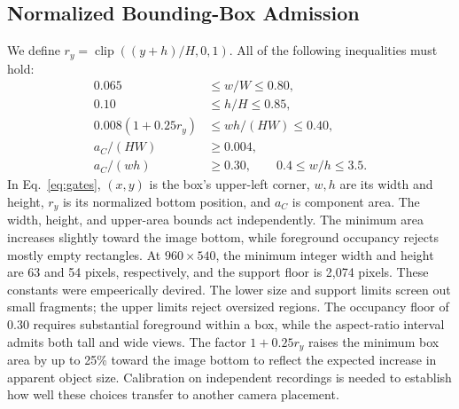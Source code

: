 \documentclass[conference]{IEEEtran}
\begin{document}
\subsection{Normalized Bounding-Box Admission}
We define $r_y=\operatorname{clip}((y+h)/H,0,1)$. All of the following inequalities must hold:
\begin{equation}
\begin{aligned}
0.065&\le w/W\le0.80,\\
0.10&\le h/H\le0.85,\\
0.008(1+0.25r_y)&\le wh/(HW)\le0.40,\\
a_C/(HW)&\ge0.004,\\
a_C/(wh)&\ge0.30,\qquad 0.4\le w/h\le3.5.
\end{aligned}
\label{eq:gates}
\end{equation}
In Eq.~\eqref{eq:gates}, $(x,y)$ is the box's upper-left corner, $w,h$ are its width and height, $r_y$ is its normalized bottom position, and $a_C$ is component area. The width, height, and upper-area bounds act independently. The minimum area increases slightly toward the image bottom, while foreground occupancy rejects mostly empty rectangles. At $960\times540$, the minimum integer width and height are 63 and 54 pixels, respectively, and the support floor is 2,074 pixels. These constants were empeerically devired. The lower size and support limits screen out small fragments; the upper limits reject oversized regions. The occupancy floor of 0.30 requires substantial foreground within a box, while the aspect-ratio interval admits both tall and wide views. The factor $1+0.25r_y$ raises the minimum box area by up to 25\% toward the image bottom to reflect the expected increase in apparent object size. Calibration on independent recordings is needed to establish how well these choices transfer to another camera placement.
\end{document}
